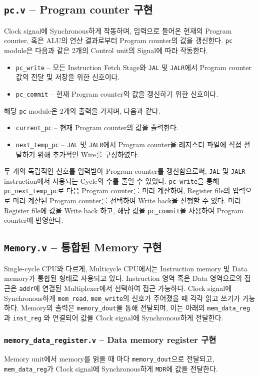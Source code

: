 \documentclass{scrartcl}
\begin{document}
\subsection{\texttt{pc.v} -- Program counter 구현}
Clock signal에 Synchronous하게 작동하며, 입력으로 들어온 현재의 Program counter,
혹은 ALU의 연산 결과로부터 Program counter의 값을 갱신한다.
\texttt{pc} module은 다음과 같은 2개의 Control unit의 Signal에 따라 작동한다.
\begin{itemize}
  \item \texttt{pc\_write} -- 모든 Instruction Fetch Stage와 \texttt{JAL} 및 \texttt{JALR}에서 Program counter 값의 전달 및 저장을 위한 신호이다.
  \item \texttt{pc\_commit} -- 현재 Program counter의 값을 갱신하기 위한 신호이다.
\end{itemize}
해당 \texttt{pc} module은 2개의 출력을 가지며, 다음과 같다.
\begin{itemize}
  \item \texttt{current\_pc} -- 현재 Program counter의 값을 출력한다.
  \item \texttt{next\_temp\_pc} -- \texttt{JAL} 및 \texttt{JALR}에서 Program counter을 레지스터 파일에 직접 전달하기 위해 추가적인 Wire를 구성하였다.
\end{itemize}
두 개의 독립적인 신호를 입력받아 Program counter를 갱신함으로써, \texttt{JAL} 및 \texttt{JALR} instruction에서 사용되는 Cycle의 수를 줄일 수 있었다.
\texttt{pc\_write}을 통해 \texttt{pc\_next\_temp\_pc}로 다음 Program counter를 미리 계산하여, Register file의 입력으로 미리 계산된 Program counter를
선택하여 Write back을 진행할 수 있다. 미리 Register file에 값을 Write back 하고, 해당 값을 \texttt{pc\_commit}을 사용하여 Program counter에 반영한다.

\subsection{\texttt{Memory.v} -- 통합된 Memory 구현}
Single-cycle CPU와 다르게, Multicycle CPU에서는 Instruction memory 및 Data memory가 통합된 형태로 사용되고 있다.
Instruction 영역 혹은 Data 영역으로의 접근은 \texttt{addr}에 연결된 Multiplexer에서 선택하여 접근 가능하다.
Clock signal에 Synchronous하게 \texttt{mem\_read}, \texttt{mem\_write}의 신호가 주어졌을 때 각각 읽고 쓰기가 가능하다.
Memory의 출력은 \texttt{memory\_dout}을 통해 전달되며, 이는 아래의 \texttt{mem\_data\_reg} 과 \texttt{inst\_reg} 와 연결되어
값을 Clock signal에 Synchronous하게 전달한다.

\subsubsection{\texttt{memory\_data\_register.v} -- Data memory register 구현}
Memory unit에서 memory를 읽을 때 마다 \texttt{memory\_dout}으로 전달되고, \texttt{mem\_data\_reg}가 Clock signal에
Synchronous하게 \texttt{MDR}에 값을 전달한다.
\end{document}
